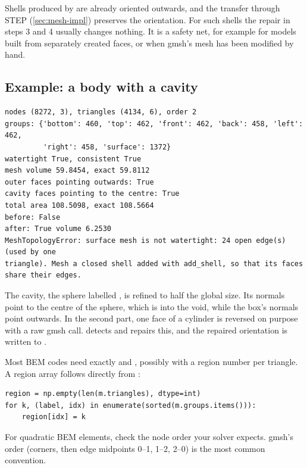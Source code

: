 \begin{note}
Shells produced by \NF{} are already oriented outwards, and the transfer through STEP
(\cref{sec:mesh-impl}) preserves the orientation. For such shells the repair in steps 3 and 4
usually changes nothing. It is a safety net, for example for models built from separately
created faces, or when gmsh's mesh has been modified by hand.
\end{note}

\subsection{Example: a body with a cavity}


\begin{lstlisting}[style=text]
nodes (8272, 3), triangles (4134, 6), order 2
groups: {'bottom': 460, 'top': 462, 'front': 462, 'back': 458, 'left': 462,
         'right': 458, 'surface': 1372}
watertight True, consistent True
mesh volume 59.8454, exact 59.8112
outer faces pointing outwards: True
cavity faces pointing to the centre: True
total area 108.5098, exact 108.5664
before: False
after: True volume 6.2530
MeshTopologyError: surface mesh is not watertight: 24 open edge(s) (used by one
triangle). Mesh a closed shell added with add_shell, so that its faces share their edges.
\end{lstlisting}

The cavity, the sphere labelled , is refined to half the global size. Its
normals point to the centre of the sphere, which is into the void, while the box's normals
point outwards. In the second part, one face of a cylinder is reversed on purpose with a raw
gmsh call.  detects and repairs this, and the repaired orientation is
written to .

\begin{tip}
Most BEM codes need exactly  and , possibly with a region number
per triangle. A region array follows directly from :
\begin{lstlisting}[style=python]
region = np.empty(len(m.triangles), dtype=int)
for k, (label, idx) in enumerate(sorted(m.groups.items())):
    region[idx] = k
\end{lstlisting}
For quadratic BEM elements, check the node order your solver expects. gmsh's order (corners,
then edge midpoints 0--1, 1--2, 2--0) is the most common convention.
\end{tip}

